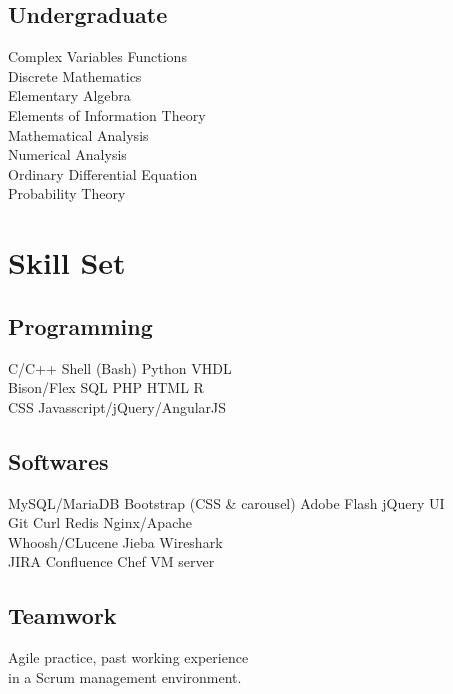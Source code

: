 \documentclass[]{deedy-resume-openfont}
\begin{document}
\begin{minipage}[t]{0.33\textwidth}
\subsection{Undergraduate}
Complex Variables Functions \\
Discrete Mathematics \\
Elementary Algebra \\
Elements of Information Theory \\
Mathematical Analysis \\
Numerical Analysis \\
Ordinary Differential Equation \\
Probability Theory
\sectionsep


\section{Skill Set}
\subsection{Programming}
\textbullet{} C/C++ \textbullet{} Shell (Bash) \textbullet{} Python \textbullet{} VHDL \\
\textbullet{} Bison/Flex \textbullet{} SQL \textbullet{} PHP \textbullet{} HTML \textbullet{} R \\
\textbullet{} CSS \textbullet{}  Javasscript/jQuery/AngularJS \\
\sectionsep

\subsection{Softwares}
\textbullet{} MySQL/MariaDB \textbullet{} Bootstrap (CSS \& carousel) \textbullet{} Adobe Flash \textbullet{} jQuery UI \\
\textbullet{} Git \textbullet{} Curl \textbullet{} Redis \textbullet{} Nginx/Apache \\
\textbullet{} Whoosh/CLucene \textbullet{} Jieba \textbullet Wireshark \\
\textbullet{} JIRA \textbullet{} Confluence \textbullet Chef VM server \\

\sectionsep

\subsection{Teamwork}
Agile practice, past working experience \\
in a Scrum management environment. \\


\end{minipage}
\end{document}
